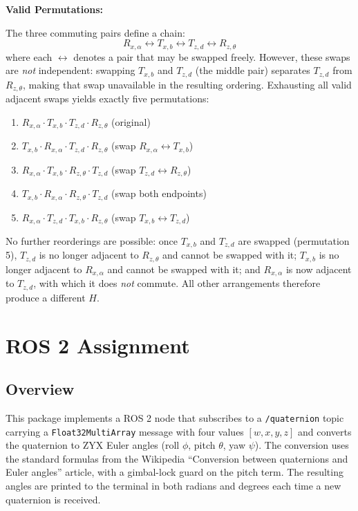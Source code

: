 \documentclass[12pt]{article}
\begin{document}
\textbf{Valid Permutations:}

The three commuting pairs define a chain:
\[
R_{x,\alpha} \leftrightarrow T_{x,b} \leftrightarrow T_{z,d} \leftrightarrow R_{z,\theta}
\]
where each $\leftrightarrow$ denotes a pair that may be swapped freely.
However, these swaps are \emph{not} independent: swapping $T_{x,b}$ and
$T_{z,d}$ (the middle pair) separates $T_{z,d}$ from $R_{z,\theta}$,
making that swap unavailable in the resulting ordering. Exhausting all
valid adjacent swaps yields exactly five permutations:

\begin{enumerate}
    \item $R_{x,\alpha} \cdot T_{x,b} \cdot T_{z,d} \cdot R_{z,\theta}$
    \quad (original)
    \item $T_{x,b} \cdot R_{x,\alpha} \cdot T_{z,d} \cdot R_{z,\theta}$
    \quad (swap $R_{x,\alpha} \leftrightarrow T_{x,b}$)
    \item $R_{x,\alpha} \cdot T_{x,b} \cdot R_{z,\theta} \cdot T_{z,d}$
    \quad (swap $T_{z,d} \leftrightarrow R_{z,\theta}$)
    \item $T_{x,b} \cdot R_{x,\alpha} \cdot R_{z,\theta} \cdot T_{z,d}$
    \quad (swap both endpoints)
    \item $R_{x,\alpha} \cdot T_{z,d} \cdot T_{x,b} \cdot R_{z,\theta}$
    \quad (swap $T_{x,b} \leftrightarrow T_{z,d}$)
\end{enumerate}

No further reorderings are possible: once $T_{x,b}$ and $T_{z,d}$ are
swapped (permutation 5), $T_{z,d}$ is no longer adjacent to $R_{z,\theta}$
and cannot be swapped with it; $T_{x,b}$ is no longer adjacent to
$R_{x,\alpha}$ and cannot be swapped with it; and $R_{x,\alpha}$ is now
adjacent to $T_{z,d}$, with which it does \emph{not} commute. All other
arrangements therefore produce a different $H$.

\newpage

\section{ROS 2 Assignment}

\subsection{Overview}
This package implements a ROS 2 node that subscribes to a \texttt{/quaternion} topic
carrying a \texttt{Float32MultiArray} message with four values $[w, x, y, z]$ and
converts the quaternion to ZYX Euler angles (roll $\phi$, pitch $\theta$, yaw $\psi$).
The conversion uses the standard formulas from the Wikipedia ``Conversion between
quaternions and Euler angles'' article, with a gimbal-lock guard on the pitch term.
The resulting angles are printed to the terminal in both radians and degrees each time
a new quaternion is received.
\end{document}
